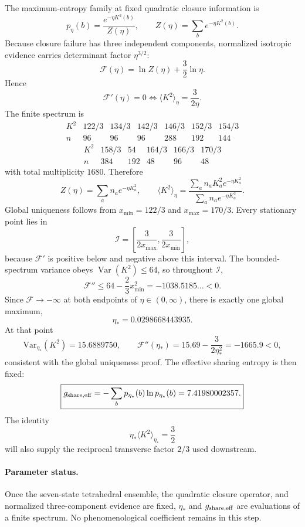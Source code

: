 \documentclass[11pt]{article}
\begin{document}
The maximum-entropy family at fixed quadratic closure information is
\[
p_\eta(b)=\frac{e^{-\eta K^2(b)}}{Z(\eta)},
\qquad
Z(\eta)=\sum_b e^{-\eta K^2(b)}.
\]
Because closure failure has three independent components, normalized isotropic evidence carries determinant factor $\eta^{3/2}$:
\[
\mathcal F(\eta)=\ln Z(\eta)+\frac32\ln\eta.
\]
Hence
\[
\mathcal F'(\eta)=0
\Longleftrightarrow
\boxed{\langle K^2\rangle_\eta=\frac{3}{2\eta}}.
\]
The finite spectrum is
\[
\begin{array}{c|cccccc}
K^2&122/3&134/3&142/3&146/3&152/3&154/3\\ \hline
n&96&96&96&288&192&144
\end{array}
\]
\[
\begin{array}{c|ccccc}
K^2&158/3&54&164/3&166/3&170/3\\ \hline
n&384&192&48&96&48
\end{array}
\]
with total multiplicity $1680$. Therefore
\[
Z(\eta)=\sum_a n_a e^{-\eta K_a^2},
\qquad
\langle K^2\rangle_\eta=
\frac{\sum_a n_a K_a^2e^{-\eta K_a^2}}
{\sum_a n_a e^{-\eta K_a^2}}.
\]
Global uniqueness follows from $x_{\min}=122/3$ and $x_{\max}=170/3$. Every stationary point lies in
\[
\mathcal I=\left[\frac{3}{2x_{\max}},\frac{3}{2x_{\min}}\right],
\]
because $\mathcal F'$ is positive below and negative above this interval. The bounded-spectrum variance obeys $\operatorname{Var}(K^2)\le64$, so throughout $\mathcal I$,
\[
\mathcal F''\le64-\frac23x_{\min}^2=-1038.5185\ldots<0.
\]
Since $\mathcal F\to-\infty$ at both endpoints of $\eta\in(0,\infty)$, there is exactly one global maximum,
\[
\boxed{\eta_*=0.0298668443935}.
\]
At that point
\[
\mathrm{Var}_{\eta_*}(K^2)=15.6889750,
\qquad
\mathcal F''(\eta_*)
=15.69-\frac{3}{2\eta_*^2}
=-1665.9<0,
\]
consistent with the global uniqueness proof. The effective sharing entropy is then fixed:
\[
\boxed{
g_{\rm share,eff}
=-\sum_b p_{\eta_*}(b)\ln p_{\eta_*}(b)
=7.41980002357.
}
\]
The identity
\[
\eta_*\langle K^2\rangle_{\eta_*}=\frac32
\]
will also supply the reciprocal transverse factor $2/3$ used downstream.

\paragraph{Parameter status.}
Once the seven-state tetrahedral ensemble, the quadratic closure operator, and normalized three-component evidence are fixed, $\eta_*$ and $g_{\rm share,eff}$ are evaluations of a finite spectrum. No phenomenological coefficient remains in this step.
\end{document}
